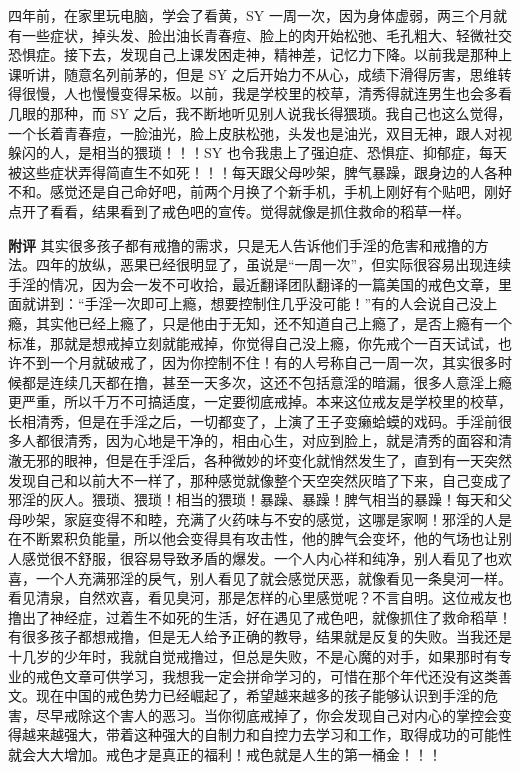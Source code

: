 \begin{case}
    四年前，在家里玩电脑，学会了看黄，SY 一周一次，因为身体虚弱，两三个月就有一些症状，掉头发、脸出油长青春痘、脸上的肉开始松弛、毛孔粗大、轻微社交恐惧症。接下去，发现自己上课发困走神，精神差，记忆力下降。以前我是那种上课听讲，随意名列前茅的，但是 SY 之后开始力不从心，成绩下滑得厉害，思维转得很慢，人也慢慢变得呆板。以前，我是学校里的校草，清秀得就连男生也会多看几眼的那种，而 SY 之后，我不断地听见别人说我长得猥琐。我自己也这么觉得，一个长着青春痘，一脸油光，脸上皮肤松弛，头发也是油光，双目无神，跟人对视躲闪的人，是相当的猥琐！！！SY 也令我患上了强迫症、恐惧症、抑郁症，每天被这些症状弄得简直生不如死！！！每天跟父母吵架，脾气暴躁，跟身边的人各种不和。感觉还是自己命好吧，前两个月换了个新手机，手机上刚好有个贴吧，刚好点开了看看，结果看到了戒色吧的宣传。觉得就像是抓住救命的稻草一样。

    \textbf{附评} 其实很多孩子都有戒撸的需求，只是无人告诉他们手淫的危害和戒撸的方法。四年的放纵，恶果已经很明显了，虽说是“一周一次”，但实际很容易出现连续手淫的情况，因为会一发不可收拾，最近翻译团队翻译的一篇美国的戒色文章，里面就讲到：“手淫一次即可上瘾，想要控制住几乎没可能！”有的人会说自己没上瘾，其实他已经上瘾了，只是他由于无知，还不知道自己上瘾了，是否上瘾有一个标准，那就是想戒掉立刻就能戒掉，你觉得自己没上瘾，你先戒个一百天试试，也许不到一个月就破戒了，因为你控制不住！有的人号称自己一周一次，其实很多时候都是连续几天都在撸，甚至一天多次，这还不包括意淫的暗漏，很多人意淫上瘾更严重，所以千万不可搞适度，一定要彻底戒掉。本来这位戒友是学校里的校草，长相清秀，但是在手淫之后，一切都变了，上演了王子变癞蛤蟆的戏码。手淫前很多人都很清秀，因为心地是干净的，相由心生，对应到脸上，就是清秀的面容和清澈无邪的眼神，但是在手淫后，各种微妙的坏变化就悄然发生了，直到有一天突然发现自己和以前大不一样了，那种感觉就像整个天空突然灰暗了下来，自己变成了邪淫的灰人。猥琐、猥琐！相当的猥琐！暴躁、暴躁！脾气相当的暴躁！每天和父母吵架，家庭变得不和睦，充满了火药味与不安的感觉，这哪是家啊！邪淫的人是在不断累积负能量，所以他会变得具有攻击性，他的脾气会变坏，他的气场也让别人感觉很不舒服，很容易导致矛盾的爆发。一个人内心祥和纯净，别人看见了也欢喜，一个人充满邪淫的戾气，别人看见了就会感觉厌恶，就像看见一条臭河一样。看见清泉，自然欢喜，看见臭河，那是怎样的心里感觉呢？不言自明。这位戒友也撸出了神经症，过着生不如死的生活，好在遇见了戒色吧，就像抓住了救命稻草！有很多孩子都想戒撸，但是无人给予正确的教导，结果就是反复的失败。当我还是十几岁的少年时，我就自觉戒撸过，但总是失败，不是心魔的对手，如果那时有专业的戒色文章可供学习，我想我一定会拼命学习的，可惜在那个年代还没有这类善文。现在中国的戒色势力已经崛起了，希望越来越多的孩子能够认识到手淫的危害，尽早戒除这个害人的恶习。当你彻底戒掉了，你会发现自己对内心的掌控会变得越来越强大，带着这种强大的自制力和自控力去学习和工作，取得成功的可能性就会大大增加。戒色才是真正的福利！戒色就是人生的第一桶金！！！
\end{case}

